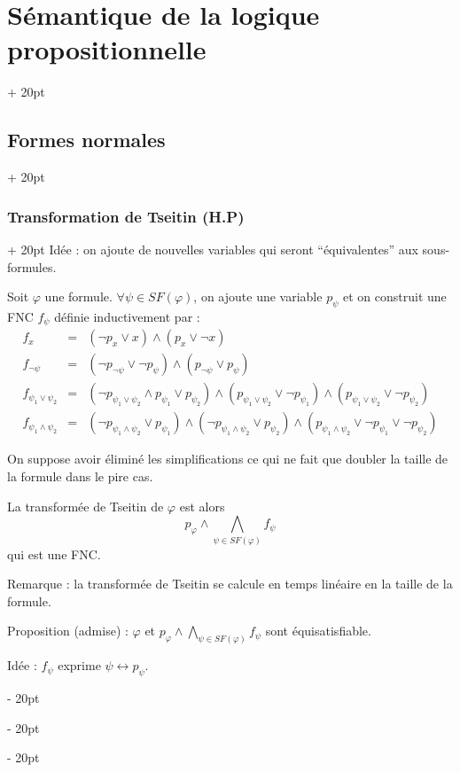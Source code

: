 \documentclass[a4paper, 12pt, twoside]{article}
\newcommand{\ind}[1][20pt]{\advance\leftskip + #1}
\newcommand{\deind}[1][20pt]{\advance\leftskip - #1}
\newenvironment{indt}[2][20pt]{#2 \par \ind[#1]}{\par \deind} %
\begin{document}
\begin{indt}{\section{Sémantique de la logique propositionnelle}}
\begin{indt}{\subsection{Formes normales}}
            \vspace{12pt}
            
            \begin{indt}{\subsubsection{Transformation de Tseitin (H.P)}}
                Idée : on ajoute de nouvelles variables qui seront ``équivalentes'' aux sous-formules.
                
                Soit $\varphi$ une formule. $\forall \psi \in SF(\varphi)$, on ajoute une variable $p_\psi$ et on construit une FNC $f_\psi$ définie inductivement par :
                    \[
                        \begin{array}{lrl}
                            f_x &=& (\neg p_x \vee x) \wedge (p_x \vee \neg x)
                            \\
                            f_{\neg \psi} &=& (\neg p_{\neg \psi} \vee \neg p_\psi) \wedge (p_{\neg \psi} \vee p_\psi)
                            \\
                            f_{\psi_1 \vee \psi_2} &=& (\neg p_{\psi_1 \vee \psi_2} \wedge p_{\psi_1} \vee p_{\psi_2}) \wedge (p_{\psi_1 \vee \psi_2} \vee \neg p_{\psi_1}) \wedge (p_{\psi_1 \vee \psi_2} \vee \neg p_{\psi_2})
                            \\
                            f_{\psi_1 \wedge \psi_2} &=& (\neg p_{\psi_1 \wedge \psi_2} \vee p_{\psi_1}) \wedge (\neg p_{\psi_1 \wedge \psi_2} \vee p_{\psi_2}) \wedge (p_{\psi_1 \wedge \psi_2} \vee \neg p_{\psi_1} \vee \neg p_{\psi_2})
                        \end{array}
                    \]
                
                On suppose avoir éliminé les simplifications ce qui ne fait que doubler la taille de la formule dans le pire cas.
                
                \vspace{12pt}
                
                La transformée de Tseitin de $\varphi$ est alors
                    \[ p_\varphi \wedge \bigwedge_{\psi \in SF(\varphi)} f_\psi \]
                qui est une FNC.
                
                \vspace{12pt}
                
                Remarque : la transformée de Tseitin se calcule en temps linéaire en la taille de la formule.
                
                Proposition (admise) : $\varphi$ et $p_\varphi \wedge \displaystyle \bigwedge_{\psi \in SF(\varphi)} f_\psi$ sont équisatisfiable.
                
                Idée : $f_\psi$ exprime $\psi \leftrightarrow p_\psi$.
            \end{indt}
        \end{indt}
        
    \end{indt}
    
    
    
\end{document}
